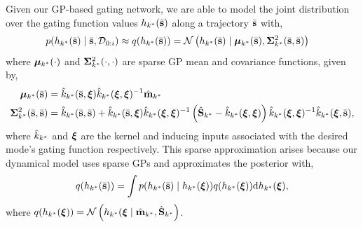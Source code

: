 \documentclass[twoside]{article}
\newcommand{\dataset}{\ensuremath{\mathcal{D}}}
\begin{document}
Given our GP-based gating network, we are able to model the joint distribution over the gating function values \(h_{k^{*}}(\bar{\mathbf{s}})\)
along a trajectory \(\bar{\mathbf{s}}\) with,
\begin{align}
p(\desiredGatingFunction(\stateTraj) \mid \stateTraj, \dataset_{0:i})
&\approx q(\desiredGatingFunction(\stateTraj))
= \mathcal{N} \left(\desiredGatingFunction(\stateTraj) \mid \desiredGatingMeanFunc(\stateTraj),
\desiredGatingCovFunc(\stateTraj, \stateTraj) \right)
\end{align}
where \(\bm\mu_{k^{*}}(\cdot)\) and \(\bm\Sigma^2_{k^{*}}(\cdot, \cdot)\) are
sparse GP mean and covariance functions, given by,
\begin{align}  \label{eq-gating-predictive-eqns}
\bm\mu_{k^{*}}(\bar{\mathbf{s}}) &=
\hat{k}_{k^{*}}(\bar{\mathbf{s}}, \bm{\xi})
\hat{k}_{k^{*}}(\bm{\xi}, \bm{\xi})^{-1}
\hat{\mathbf{m}}_{k^{*}}  \\
\bm\Sigma^2_{k^{*}}(\bar{\mathbf{s}}, \bar{\mathbf{s}}) &=
\hat{k}_{k^{*}}(\bar{\mathbf{s}}, \bar{\mathbf{s}})
+ \hat{k}_{k^{*}}(\bar{\mathbf{s}}, \bm{\xi})
\hat{k}_{k^{*}}(\bm{\xi}, \bm{\xi})^{-1}
\left( \hat{\mathbf{S}}_{k^{*}}
- \hat{k}_{k^{*}}(\bm{\xi}, \bm{\xi}) \right)
\hat{k}_{k^{*}}(\bm{\xi}, \bm{\xi})^{-1}
\hat{k}_{k^{*}}(\bm{\xi}, \bar{\mathbf{s}}), \label{eq-joint-gating-covariance}
\end{align}
where \(\hat{k}_{k^{*}}\) and
\(\bm{\xi}\) are the kernel and inducing inputs
associated with the desired mode's gating function respectively.
This sparse approximation arises because our dynamical model uses sparse GPs and approximates the posterior with,
\begin{align}
q(h_{k^{*}}(\bar{\mathbf{s}})) = \int p(h_{k^{*}}(\bar{\mathbf{s}}) \mid h_{k^{*}}(\bm{\xi}))
q(h_{k^{*}}(\bm{\xi}))
\text{d} h_{k^{*}}(\bm{\xi}),
\end{align}
where
\(q(h_{k^{*}}(\bm{\xi})) = \mathcal{N}\left( h_{k^{*}}(\bm{\xi} \mid \hat{\mathbf{m}}_{k^{*}}, \hat{\mathbf{S}}_{k^{*}} \right)\).
\end{document}
